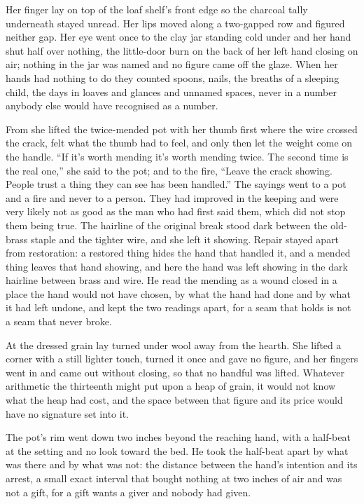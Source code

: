 Her finger lay on top of the loaf shelf's front edge so the charcoal tally underneath stayed unread. Her lips moved along a two-gapped row and figured neither gap. Her eye went once to the clay jar standing cold under  and her hand shut half over nothing, the little-door burn on the back of her left hand closing on air; nothing in the jar was named and no figure came off the glaze. When her hands had nothing to do they counted spoons, nails, the breaths of a sleeping child, the days in loaves and glances and unnamed spaces, never in a number anybody else would have recognised as a number.

From  she lifted the twice-mended pot with her thumb first where the wire crossed the crack, felt what the thumb had to feel, and only then let the weight come on the handle. “If it's worth mending it's worth mending twice. The second time is the real one,” she said to the pot; and to the fire, “Leave the crack showing. People trust a thing they can see has been handled.” The sayings went to a pot and a fire and never to a person. They had improved in the keeping and were very likely not as good as the man who had first said them, which did not stop them being true. The hairline of the original break stood dark between the old-brass staple and the tighter wire, and she left it showing. Repair stayed apart from restoration: a restored thing hides the hand that handled it, and a mended thing leaves that hand showing, and here the hand was left showing in the dark hairline between brass and wire. He read the mending as a wound closed in a place the hand would not have chosen, by what the hand had done and by what it had left undone, and kept the two readings apart, for a seam that holds is not a seam that never broke.

At  the dressed grain lay turned under wool away from the hearth. She lifted a corner with a still lighter touch, turned it once and gave no figure, and her fingers went in and came out without closing, so that no handful was lifted. Whatever arithmetic the thirteenth might put upon a heap of grain, it would not know what the heap had cost, and the space between that figure and its price would have no signature set into it.

The pot's rim went down two inches beyond the reaching hand, with a half-beat at the setting and no look toward the bed. He took the half-beat apart by what was there and by what was not: the distance between the hand's intention and its arrest, a small exact interval that bought nothing at two inches of air and was not a gift, for a gift wants a giver and nobody had given.

